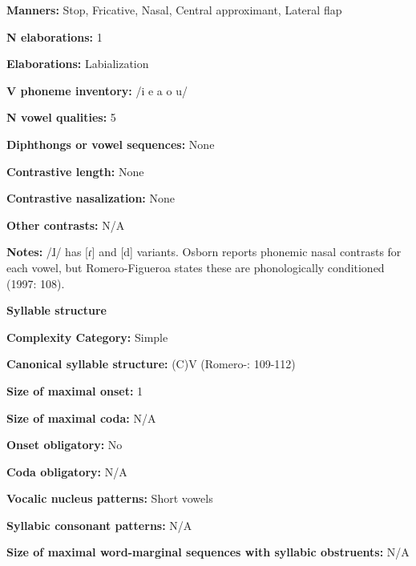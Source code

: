 \textbf{Manners:} Stop, Fricative, Nasal, Central approximant, Lateral flap



\textbf{N elaborations:} 1



\textbf{Elaborations:} Labialization



\textbf{V phoneme inventory:} /i e a o u/



\textbf{N vowel qualities:} 5



\textbf{Diphthongs or vowel sequences:} None



\textbf{Contrastive length:} None



\textbf{Contrastive nasalization:} None



\textbf{Other contrasts:} N/A



\textbf{Notes:} /ɺ/ has [ɾ] and [d] variants. Osborn reports phonemic nasal contrasts for each vowel, but Romero-Figueroa states these are phonologically conditioned (1997: 108).



\textbf{Syllable structure}



\textbf{Complexity Category:} Simple



\textbf{Canonical syllable structure:} (C)V (Romero-\citealt{Figeroa1997}: 109-112)



\textbf{Size of maximal onset:} 1



\textbf{Size of maximal coda:} N/A



\textbf{Onset obligatory:} No



\textbf{Coda obligatory:} N/A



\textbf{Vocalic nucleus patterns:} Short vowels



\textbf{Syllabic consonant patterns:} N/A



\textbf{Size of maximal word{}-marginal sequences with syllabic obstruents:} N/A



